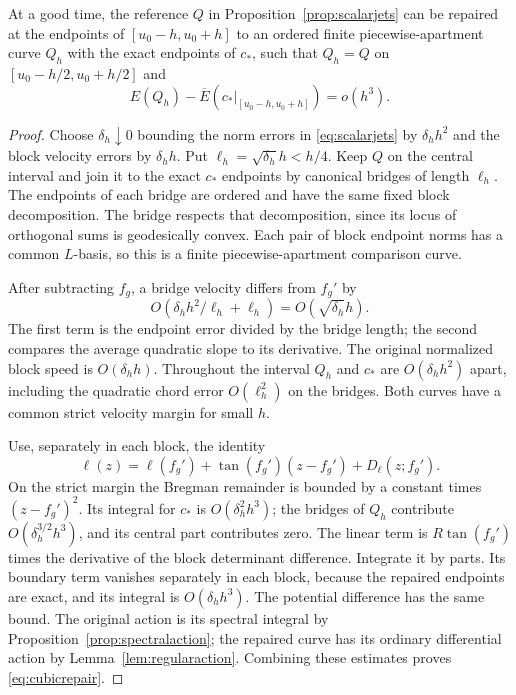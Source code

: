 \begin{lemma}\label{lem:cubicrepair}
At a good time, the reference $Q$ in
Proposition~\ref{prop:scalarjets} can be repaired at the endpoints
of $[u_0-h,u_0+h]$ to an ordered finite piecewise-apartment curve
$Q_h$ with the exact endpoints of $c_*$, such that $Q_h=Q$ on
$[u_0-h/2,u_0+h/2]$ and
\begin{equation}\label{eq:cubicrepair}
 E(Q_h)-\overline E(c_*|_{[u_0-h,u_0+h]})=o(h^3).
\end{equation}
\end{lemma}

\begin{proof}
Choose $\delta_h\downarrow0$ bounding the norm errors in
\eqref{eq:scalarjets} by $\delta_hh^2$ and the block velocity
errors by $\delta_hh$. Put $\ell_h=\sqrt{\delta_h}h<h/4$.
Keep $Q$ on the central interval and join it to the exact
$c_*$ endpoints by canonical bridges of length $\ell_h$.
The endpoints of each bridge are ordered and have the same fixed
block decomposition. The bridge respects that decomposition,
since its locus of orthogonal sums is geodesically convex.
Each pair of block endpoint norms has a common $L$-basis, so this
is a finite piecewise-apartment comparison curve.

After subtracting $f_g$, a bridge velocity differs from $f_g'$
by
\[
 O(\delta_hh^2/\ell_h+\ell_h)=O(\sqrt{\delta_h}h).
\]
The first term is the endpoint error divided by the bridge length;
the second compares the average quadratic slope to its derivative.
The original normalized block speed is $O(\delta_hh)$.
Throughout the interval $Q_h$ and $c_*$ are $O(\delta_hh^2)$
apart, including the quadratic chord error
$O(\ell_h^2)$ on the bridges. Both curves have a common strict
velocity margin for small $h$.

Use, separately in each block, the identity
\[
 \ell(z)=\ell(f_g')+\tan(f_g')(z-f_g')+D_\ell(z;f_g').
\]
On the strict margin the Bregman remainder is bounded by a
constant times $(z-f_g')^2$. Its integral for $c_*$ is
$O(\delta_h^2h^3)$; the bridges of $Q_h$ contribute
$O(\delta_h^{3/2}h^3)$, and its central part contributes zero.
The linear term is $R\tan(f_g')$ times the derivative of the
block determinant difference. Integrate it by parts. Its boundary
term vanishes separately in each block, because the repaired
endpoints are exact, and its integral is $O(\delta_hh^3)$.
The potential difference has the same bound. The original action
is its spectral integral by Proposition~\ref{prop:spectralaction};
the repaired curve has its ordinary differential action by
Lemma~\ref{lem:regularaction}. Combining these estimates proves
\eqref{eq:cubicrepair}.
\end{proof}

